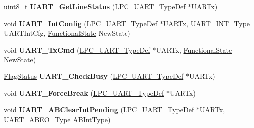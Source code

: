 \begin{DoxyCompactItemize}
\item 
\hypertarget{group___u_a_r_t___public___functions_ga089fc39675174ed51294ea96e4417f0d}{uint8\-\_\-t {\bfseries \-U\-A\-R\-T\-\_\-\-Get\-Line\-Status} (\hyperlink{struct_l_p_c___u_a_r_t___type_def}{\-L\-P\-C\-\_\-\-U\-A\-R\-T\-\_\-\-Type\-Def} $\ast$\-U\-A\-R\-Tx)}\label{group___u_a_r_t___public___functions_ga089fc39675174ed51294ea96e4417f0d}

\item 
\hypertarget{group___u_a_r_t___public___functions_ga4bad6b6b83a5345ea0d78427a5df5284}{void {\bfseries \-U\-A\-R\-T\-\_\-\-Int\-Config} (\hyperlink{struct_l_p_c___u_a_r_t___type_def}{\-L\-P\-C\-\_\-\-U\-A\-R\-T\-\_\-\-Type\-Def} $\ast$\-U\-A\-R\-Tx, \hyperlink{group___u_a_r_t___public___types_ga7ee4c5ddc0e165158d0d9f1f03e1b66c}{\-U\-A\-R\-T\-\_\-\-I\-N\-T\-\_\-\-Type} \-U\-A\-R\-T\-Int\-Cfg, \hyperlink{group___l_p_c___types___public___types_gac9a7e9a35d2513ec15c3b537aaa4fba1}{\-Functional\-State} \-New\-State)}\label{group___u_a_r_t___public___functions_ga4bad6b6b83a5345ea0d78427a5df5284}

\item 
\hypertarget{group___u_a_r_t___public___functions_ga3400356ef61d3735d9d10e04e0e95df4}{void {\bfseries \-U\-A\-R\-T\-\_\-\-Tx\-Cmd} (\hyperlink{struct_l_p_c___u_a_r_t___type_def}{\-L\-P\-C\-\_\-\-U\-A\-R\-T\-\_\-\-Type\-Def} $\ast$\-U\-A\-R\-Tx, \hyperlink{group___l_p_c___types___public___types_gac9a7e9a35d2513ec15c3b537aaa4fba1}{\-Functional\-State} \-New\-State)}\label{group___u_a_r_t___public___functions_ga3400356ef61d3735d9d10e04e0e95df4}

\item 
\hypertarget{group___u_a_r_t___public___functions_ga78570fc7b78e558ab87abacd9bb22f73}{\hyperlink{group___l_p_c___types___public___types_ga89136caac2e14c55151f527ac02daaff}{\-Flag\-Status} {\bfseries \-U\-A\-R\-T\-\_\-\-Check\-Busy} (\hyperlink{struct_l_p_c___u_a_r_t___type_def}{\-L\-P\-C\-\_\-\-U\-A\-R\-T\-\_\-\-Type\-Def} $\ast$\-U\-A\-R\-Tx)}\label{group___u_a_r_t___public___functions_ga78570fc7b78e558ab87abacd9bb22f73}

\item 
\hypertarget{group___u_a_r_t___public___functions_ga68161f5403a077379de35494b6b03273}{void {\bfseries \-U\-A\-R\-T\-\_\-\-Force\-Break} (\hyperlink{struct_l_p_c___u_a_r_t___type_def}{\-L\-P\-C\-\_\-\-U\-A\-R\-T\-\_\-\-Type\-Def} $\ast$\-U\-A\-R\-Tx)}\label{group___u_a_r_t___public___functions_ga68161f5403a077379de35494b6b03273}

\item 
\hypertarget{group___u_a_r_t___public___functions_ga0c01f920210878891c8c10cb9620d5d6}{void {\bfseries \-U\-A\-R\-T\-\_\-\-A\-B\-Clear\-Int\-Pending} (\hyperlink{struct_l_p_c___u_a_r_t___type_def}{\-L\-P\-C\-\_\-\-U\-A\-R\-T\-\_\-\-Type\-Def} $\ast$\-U\-A\-R\-Tx, \hyperlink{group___u_a_r_t___public___types_ga85f8df03cce76ca8e9404364a3b68487}{\-U\-A\-R\-T\-\_\-\-A\-B\-E\-O\-\_\-\-Type} \-A\-B\-Int\-Type)}\label{group___u_a_r_t___public___functions_ga0c01f920210878891c8c10cb9620d5d6}


\end{DoxyCompactItemize}

